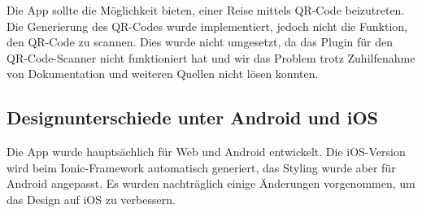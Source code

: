 Die App sollte die Möglichkeit bieten, einer Reise mittels QR-Code beizutreten.
Die Generierung des QR-Codes wurde implementiert, jedoch nicht die Funktion, den QR-Code zu scannen.
Dies wurde nicht umgesetzt, da das Plugin für den QR-Code-Scanner nicht funktioniert hat und wir das Problem trotz Zuhilfenahme von Dokumentation und weiteren Quellen nicht lösen konnten.

\subsection{Designunterschiede unter Android und iOS}

Die App wurde hauptsächlich für Web und Android entwickelt.
Die iOS-Version wird beim Ionic-Framework automatisch generiert, das Styling wurde aber für Android angepasst.
Es wurden nachträglich einige Änderungen vorgenommen, um das Design auf iOS zu verbessern.